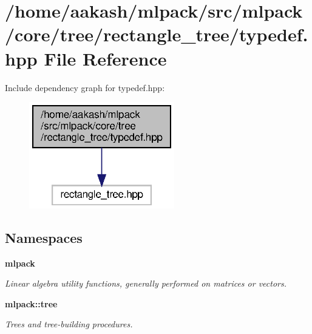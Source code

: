 \section{/home/aakash/mlpack/src/mlpack/core/tree/rectangle\+\_\+tree/typedef.hpp File Reference}
\label{core_2tree_2rectangle__tree_2typedef_8hpp}
Include dependency graph for typedef.\+hpp\+:
\nopagebreak
\begin{figure}[H]
\begin{center}
\leavevmode
\includegraphics[width=179pt]{core_2tree_2rectangle__tree_2typedef_8hpp__incl}
\end{center}
\end{figure}
\subsection*{Namespaces}
\begin{DoxyCompactItemize}
\item 
 \textbf{ mlpack}
\begin{DoxyCompactList}\small\item\em Linear algebra utility functions, generally performed on matrices or vectors. \end{DoxyCompactList}\item 
 \textbf{ mlpack\+::tree}
\begin{DoxyCompactList}\small\item\em Trees and tree-\/building procedures. \end{DoxyCompactList}\end{DoxyCompactItemize}
